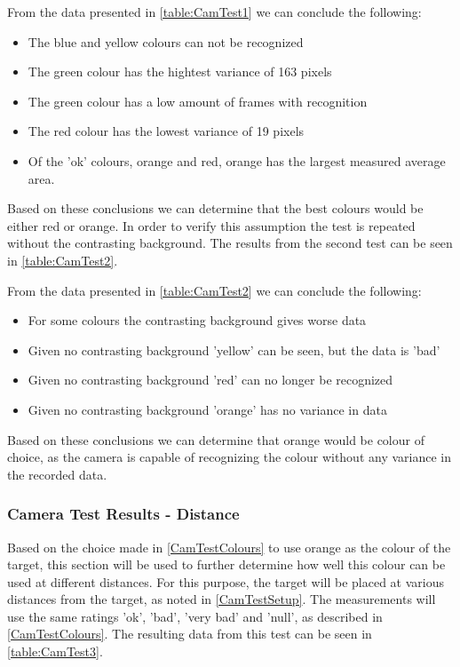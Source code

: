 
From the data presented in \autoref{table:CamTest1} we can conclude the
following:
\begin{itemize}
  \item The blue and yellow colours can not be recognized
  \item The green colour has the hightest variance of 163 pixels
  \item The green colour has a low amount of frames with recognition
  \item The red colour has the lowest variance of 19 pixels
  \item Of the 'ok' colours, orange and red, orange has the largest measured
  average area.
\end{itemize} 

Based on these conclusions we can determine that the best colours would be
either red or orange. In order to verify this assumption the test is repeated
without the contrasting background. The results from the second test can be seen
in \autoref{table:CamTest2}.


From the data presented in \autoref{table:CamTest2} we can conclude the
following:
\begin{itemize}
  \item For some colours the contrasting background gives worse data
  \item Given no contrasting background 'yellow' can be seen, but the data is
  'bad'
  \item Given no contrasting background 'red' can no longer be recognized
  \item Given no contrasting background 'orange' has no variance in data
\end{itemize} 

Based on these conclusions we can determine that orange would be colour of
choice, as the camera is capable of recognizing the colour without any variance
in the recorded data.

\subsubsection{Camera Test Results - Distance}\label{CamTestDistance}
Based on the choice made in \autoref{CamTestColours} to use orange as the colour
of the target, this section will be used to further determine how well this
colour can be used at different distances. For this purpose, the target will be
placed at various distances from the target, as noted in \autoref{CamTestSetup}.
The measurements will use the same ratings 'ok', 'bad', 'very bad' and 'null',
as described in \autoref{CamTestColours}. The resulting data from this test can be
seen in \autoref{table:CamTest3}. 

